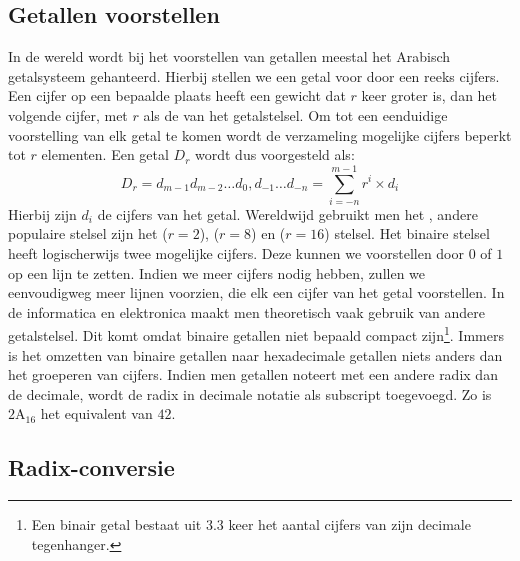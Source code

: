 \subsection{Getallen voorstellen}
In de wereld wordt bij het voorstellen van getallen meestal het Arabisch getalsysteem gehanteerd. Hierbij stellen we een getal voor door een reeks cijfers. Een cijfer op een bepaalde plaats heeft een gewicht dat $r$ keer groter is, dan het volgende cijfer, met $r$ als de  van het getalstelsel. Om tot een eenduidige voorstelling van elk getal te komen wordt de verzameling mogelijke cijfers beperkt tot $r$ elementen. Een getal $D_r$ wordt dus voorgesteld als:
\begin{equation}
D_r=d_{m-1}d_{m-2}\ldots d_0,d_{-1}\ldots d_{-n}=\displaystyle\sum_{i=-n}^{m-1}{r^i\times d_i}
\label{eqn:numberRepresentation}
\end{equation}
Hierbij zijn $d_i$ de cijfers van het getal. Wereldwijd gebruikt men het , andere populaire stelsel zijn het  ($r=2$),  ($r=8$) en  ($r=16$) stelsel. Het binaire stelsel heeft logischerwijs twee mogelijke cijfers. Deze kunnen we voorstellen door $0$ of $1$ op een lijn te zetten. Indien we meer cijfers nodig hebben, zullen we eenvoudigweg meer lijnen voorzien, die elk een cijfer van het getal voorstellen. In de informatica en elektronica maakt men theoretisch vaak gebruik van andere getalstelsel. Dit komt omdat binaire getallen niet bepaald compact zijn\footnote{Een binair getal bestaat uit $3.3$ keer het aantal cijfers van zijn decimale tegenhanger.}. Immers is het omzetten van binaire getallen naar hexadecimale getallen niets anders dan het groeperen van cijfers. Indien men getallen noteert met een andere radix dan de decimale, wordt de radix in decimale notatie als subscript toegevoegd. Zo is $\mbox{2A}_{16}$ het equivalent van $42$.
\subsection{Radix-conversie}
